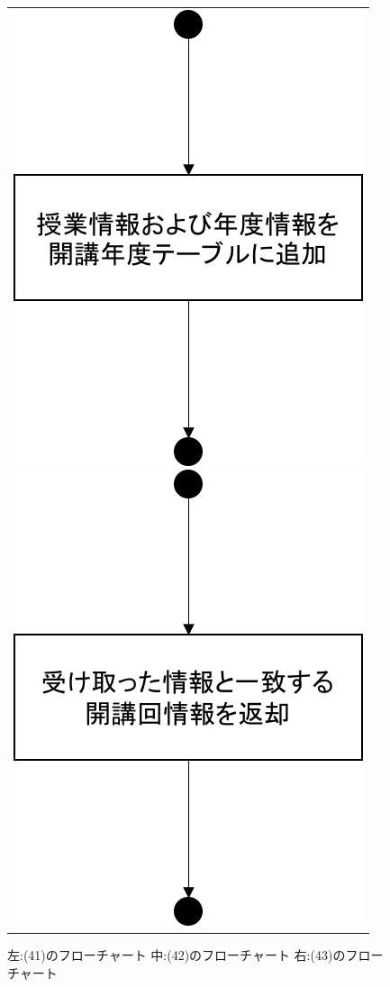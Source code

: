 \begin{figure}[htbp]
\begin{tabular}{c}
\begin{minipage}{0.33\hsize}
\begin{center}
   \includegraphics[width=0.8\linewidth,clip]{./img/flow/42.png}
  \end{center}
 \end{minipage}
 \begin{minipage}{0.33\hsize}
  \begin{center}
   \includegraphics[width=0.8\linewidth,clip]{./img/flow/43.png}
  \end{center}
 \end{minipage}
\end{tabular}
 \caption{左:(41)のフローチャート 中:(42)のフローチャート 右:(43)のフローチャート}\label{fig:41to42to43}
\end{figure}

